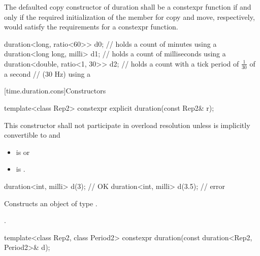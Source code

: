 \pnum
The defaulted copy constructor of duration shall be a
constexpr function if and only if the required initialization
of the member  for copy and move, respectively, would
satisfy the requirements for a constexpr function.

\pnum
\begin{example}
\begin{codeblock}
duration<long, ratio<60>> d0;       // holds a count of minutes using a 
duration<long long, milli> d1;      // holds a count of milliseconds using a 
duration<double, ratio<1, 30>>  d2; // holds a count with a tick period of $\frac{1}{30}$ of a second
                                    // (30 Hz) using a 
\end{codeblock}
\end{example}

[time.duration.cons]{Constructors}

%
\begin{itemdecl}
template<class Rep2>
  constexpr explicit duration(const Rep2& r);
\end{itemdecl}

\begin{itemdescr}
\pnum
\remarks
This constructor shall not participate in overload
resolution unless
 is implicitly convertible to  and
\begin{itemize}
\item {} is  or
\item {} is .
\end{itemize}
\begin{example}
\begin{codeblock}
duration<int, milli> d(3);          // OK
duration<int, milli> d(3.5);        // error
\end{codeblock}
\end{example}

\pnum
\effects
Constructs an object of type .

\pnum
\ensures
{}.
\end{itemdescr}

%
\begin{itemdecl}
template<class Rep2, class Period2>
  constexpr duration(const duration<Rep2, Period2>& d);
\end{itemdecl}

